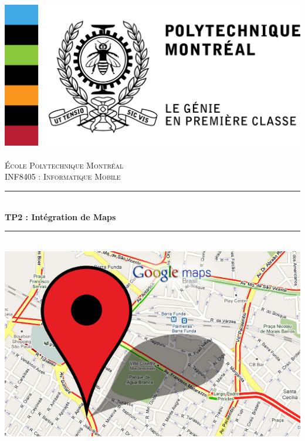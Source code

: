 \documentclass[12pt, a4paper]{article}%
\newcommand{\HRule}{\rule{\linewidth}{0.5mm}}
\begin{document}
\begin{titlepage}
  \begin{sffamily}
  \begin{center}

    \includegraphics[scale=1]{Images/polytechnique_genie_gauche_fr_rgb.png}~\\[1.5cm]

    \textsc{\LARGE École Polytechnique Montréal}\\[2cm]

    \textsc{\Large INF8405 : Informatique Mobile}\\[1.5cm]

    \HRule \\[0.4cm]
    { \huge \bfseries TP2 : Intégration de Maps\\[0.4cm] }

    \HRule \\[2cm]
    \includegraphics[scale=0.3]{Images/Google-Maps.jpg}\\[2cm]


\end{center}
\end{sffamily}
\end{titlepage}
\end{document}
